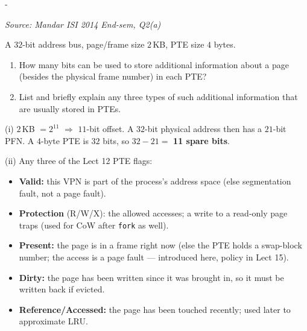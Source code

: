 \documentclass[11pt,a4paper]{article}
\makeatletter
\newcommand{\keepspace}[1]{\par\penalty-100\begingroup
  \setlength{\dimen@}{#1}\dimen@ii\pagegoal\advance\dimen@ii-\pagetotal
  \ifdim\dimen@>\dimen@ii\ifdim\dimen@ii>\z@\vfil\fi\break\fi\endgroup}
\newcounter{qn}[section]
\newenvironment{Qn}[4]{%
  \refstepcounter{qn}\keepspace{7\baselineskip}%
  \begin{tcolorbox}[qboxstyle, title={Q\thesection.\theqn\ \ [#1 \textbar\ #2]\ \ #4}]%
  {\footnotesize\color{g3}\textit{Source: #3}}\par\smallskip%
}{%
  \end{tcolorbox}%
}
\newenvironment{Sol}{%
  \begin{tcolorbox}[sboxstyle, title={Solution}]%
}{%
  \end{tcolorbox}\vspace{0.35em}%
}
\makeatother
\begin{document}
\begin{Qn}{Medium}{Lect 12}{Mandar ISI 2014 End-sem, Q2(a)}{Spare bits in a 4-byte PTE, and what they usually store}
A $32$-bit address bus, page/frame size $2$\,KB, PTE size $4$ bytes.
\begin{enumerate}
  \item[(i)] How many bits can be used to store additional information
        about a page (besides the physical frame number) in each PTE?
  \item[(ii)] List and briefly explain any three types of such
        additional information that are usually stored in PTEs.
\end{enumerate}
\end{Qn}
\begin{Sol}
(i) $2$\,KB $=2^{11}$ $\Rightarrow$ $11$-bit offset. A $32$-bit
physical address then has a $21$-bit PFN. A $4$-byte PTE is $32$
bits, so $32-21=$ \textbf{11 spare bits}.

(ii) Any three of the Lect 12 PTE flags:
\begin{itemize}
  \item \textbf{Valid:} this VPN is part of the process's address
        space (else segmentation fault, not a page fault).
  \item \textbf{Protection} (R/W/X): the allowed accesses; a write
        to a read-only page traps (used for CoW after \texttt{fork}
        as well).
  \item \textbf{Present:} the page is in a frame right now (else the
        PTE holds a swap-block number; the access is a page fault ---
        introduced here, policy in Lect 15).
  \item \textbf{Dirty:} the page has been written since it was
        brought in, so it must be written back if evicted.
  \item \textbf{Reference/Accessed:} the page has been touched
        recently; used later to approximate LRU.
\end{itemize}
\end{Sol}

\clearpage
\end{document}
